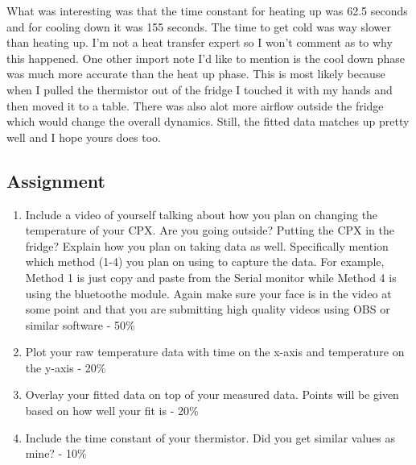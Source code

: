 What was interesting was that the time constant for heating up was 62.5 seconds and for cooling down it was 155 seconds. The time to get cold was way slower than heating up. I’m not a heat transfer expert so I won’t comment as to why this happened. One other import note I’d like to mention is the cool down phase was much more accurate than the heat up phase. This is most likely because when I pulled the thermistor out of the fridge I touched it with my hands and then moved it to a table. There was also alot more airflow outside the fridge which would change the overall dynamics. Still, the fitted data matches up pretty well and I hope yours does too.

\subsection{Assignment}



\begin{enumerate}
\item Include a video of yourself talking about how you plan on changing the temperature of your CPX. Are you going outside? Putting the CPX in the fridge? Explain how you plan on taking data as well. Specifically mention which method (1-4) you plan on using to capture the data. For example, Method 1 is just copy and paste from the Serial monitor while Method 4 is using the bluetoothe module. Again make sure your face is in the video at some point and that you are submitting high quality videos using OBS or similar software - 50\%
\item Plot your raw temperature data with time on the x-axis and temperature on the y-axis - 20\%
\item Overlay your fitted data on top of your measured data. Points will be given based on how well your fit is - 20\%
\item Include the time constant of your thermistor. Did you get similar values as mine? - 10\%
\end{enumerate}
